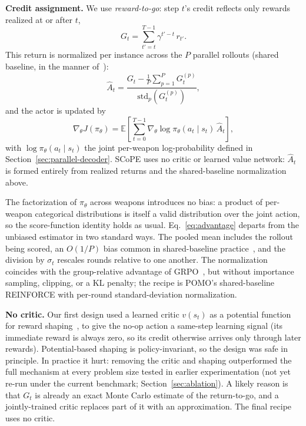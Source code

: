 \textbf{Credit assignment.} We use \emph{reward-to-go}: step $t$'s credit reflects only rewards realized at or after $t$,
\begin{equation}
G_t = \sum_{t'=t}^{T-1} \gamma^{t'-t}\, r_{t'}.
\end{equation}
This return is normalized per instance across the $P$ parallel rollouts (shared baseline, in the manner of~\cite{kwon2020pomo}):
\begin{equation}
\label{eq:advantage}
\hat{A}_t = \frac{G_t - \frac{1}{P}\sum_{p=1}^P G_t^{(p)}}{\text{std}_p\!\left(G_t^{(p)}\right)},
\end{equation}
and the actor is updated by
\begin{equation}
\label{eq:actor-gradient}
\nabla_\theta J(\pi_\theta) = \mathbb{E}\!\left[\sum_{t=0}^{T-1} \nabla_\theta \log \pi_\theta(a_t \mid s_t)\, \hat{A}_t\right],
\end{equation}
with $\log \pi_\theta(a_t\mid s_t)$ the joint per-weapon log-probability defined in Section~\ref{sec:parallel-decoder}. SCoPE uses no critic or learned value network: $\hat{A}_t$ is formed entirely from realized returns and the shared-baseline normalization above.

The factorization of $\pi_\theta$ across weapons introduces no bias: a product of per-weapon categorical distributions is itself a valid distribution over the joint action, so the score-function identity holds as usual. Eq.~\eqref{eq:advantage} departs from the unbiased estimator in two standard ways. The pooled mean includes the rollout being scored, an $O(1/P)$ bias common in shared-baseline practice~\cite{kwon2020pomo}, and the division by $\sigma_t$ rescales rounds relative to one another. The normalization coincides with the group-relative advantage of GRPO~\cite{shao2024deepseekmath}, but without importance sampling, clipping, or a KL penalty; the recipe is POMO's shared-baseline REINFORCE with per-round standard-deviation normalization.

\textbf{No critic.} Our first design used a learned critic $v(s_t)$ as a potential function for reward shaping~\cite{ng1999shaping}, to give the no-op action a same-step learning signal (its immediate reward is always zero, so its credit otherwise arrives only through later rewards). Potential-based shaping is policy-invariant, so the design was safe in principle. In practice it hurt: removing the critic and shaping outperformed the full mechanism at every problem size tested in earlier experimentation (not yet re-run under the current benchmark; Section~\ref{sec:ablation}). A likely reason is that $G_t$ is already an exact Monte Carlo estimate of the return-to-go, and a jointly-trained critic replaces part of it with an approximation. The final recipe uses no critic.

